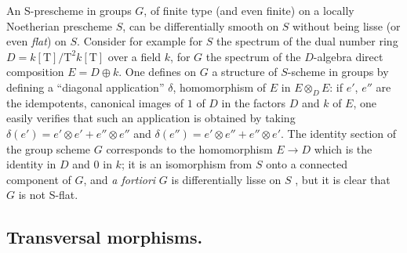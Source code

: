 
\begin{remark}[17.12.8]
\label{IV.17.12.8}
An S-prescheme in groups $G$, of finite type (and even finite) on a locally Noetherian prescheme $S$, can be differentially smooth on $S$ without being lisse (or even \emph{flat}) on $S$.
Consider for example for $S$ the spectrum of the dual number ring $D=k[\mathrm{T}]/\mathrm{T}^2 k[\mathrm{T}]$ over a field $k$, for $G$ the spectrum of the $D$-algebra direct composition $E=D\oplus k$.
One defines on $G$ a structure of $S$-scheme in groups by defining a ``diagonal application'' $\delta$, homomorphism of $E$ in $E\otimes_D E$: if $e'$, $e''$ are the idempotents, canonical images of $1$ of $D$ in the factors $D$ and $k$ of $E$, one easily verifies that such an application is obtained by taking $\delta(e')=e'\otimes e'+e''\otimes e''$ and $\delta(e'')=e'\otimes e''+e''\otimes e'$.
The identity section of the group scheme $G$ corresponds to the homomorphism $E\to D$ which is the identity in $D$ and $0$ in $k$; it is an isomorphism from $S$ onto a connected component of $G$, and \emph{a fortiori} $G$ is differentially lisse on $S$ , but it is clear that $G$ is not S-flat.
\end{remark}


\subsection{Transversal morphisms.}
\label{subsection:IV.17.13}

